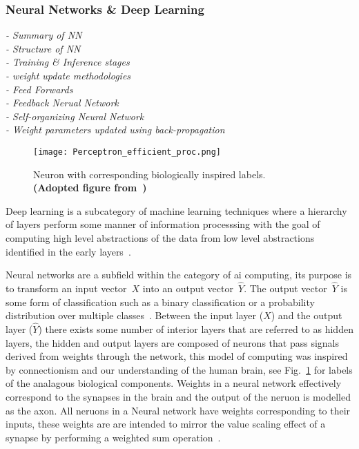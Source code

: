 \documentclass[../../D1.tex]{subfiles}
\begin{document}
\subsubsection{Neural Networks \& Deep Learning}
\emph{
    - Summary of NN\\
    - Structure of NN\\
    - Training \& Inference stages\\
    - weight update methodologies\\
    - Feed Forwards\\
    - Feedback Nerual Network\\
    - Self-organizing Neural Network\\
    - Weight parameters updated using back-propagation}


\begin{figure}
    \texttt{[image: Perceptron\_efficient\_proc.png]}
    \caption{Neuron with corresponding biologically inspired labels.\\ \textbf{(Adopted figure from~\autocite{szeEfficientProcessingDeep2017})}}
    \label{fig:neuronLabeled}
\end{figure}
Deep learning is a subcategory of machine learning techniques where a hierarchy of layers perform some manner of information processsing with the goal of computing high level abstractions of the data from low level abstractions identified in the early layers~\autocite{dengTutorialSurveyArchitectures2014}.


Neural networks are a subfield within the category of \Acrlong{ai} computing, its purpose is to transform an input vector~$X$ into an output vector~$\hat{Y}$. 
The output vector~$\hat{Y}$ is some form of classification such as a binary classification or a probability distribution over multiple classes~\autocite{thierry-miegHowFundamentalConcepts}. 
Between the input layer ($X$) and the output layer ($\hat{Y}$) there exists some number of interior layers that are referred to as hidden layers, the hidden and output layers are composed of neurons that pass signals derived from weights through the network, this model of computing was inspired by connectionism and our understanding of the human brain, see Fig.~\ref{fig:neuronLabeled} for labels of the analagous biological components. 
Weights in a neural network effectively correspond to the synapses in the brain and the output of the neruon is modelled as the axon. 
All neruons in a Neural network have weights corresponding to their inputs, these weights are are intended to mirror the value scaling effect of a synapse by performing a weighted sum operation~\autocite{szeEfficientProcessingDeep2017}.
\end{document}
